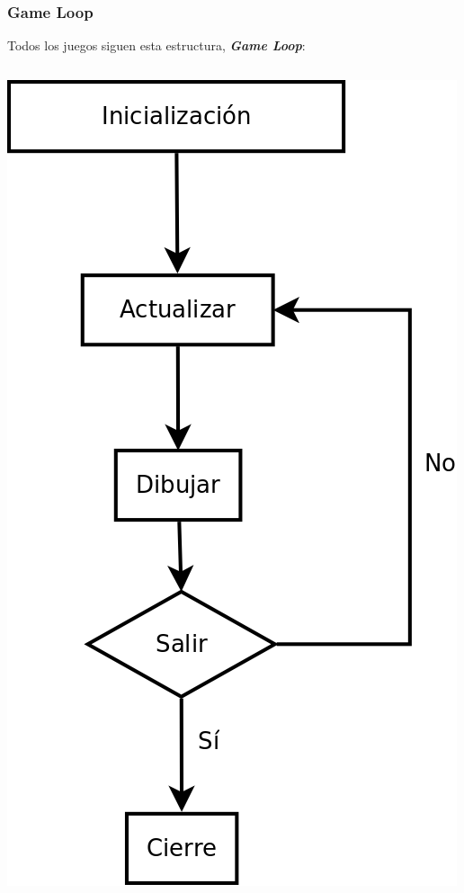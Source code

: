 \documentclass{beamer}
\begin{document}
\begin{frame}
	\frametitle{Game Loop}
	
	\begin{center}
		Todos los juegos siguen esta estructura, \textbf{\emph{Game Loop}}:
	\end{center}	
	
	\begin{columns}
	
	\column{150pt}
	\begin{center}
		\includegraphics[scale=0.25]{img/gameloop.png}
	\end{center}	
	

\end{columns}
\end{frame}
\end{document}
